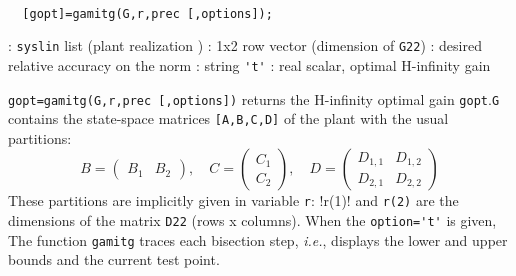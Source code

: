 \begin{mandesc}
   \\ %
\end{mandesc}
\begin{calling_sequence}
\begin{verbatim}
  [gopt]=gamitg(G,r,prec [,options]);  
\end{verbatim}
\end{calling_sequence}
\begin{parameters}
  \begin{varlist}
    : \verb!syslin! list (plant realization )
    : 1x2 row vector (dimension of \verb!G22!)
    : desired relative accuracy on the norm
    : string \verb!'t'!
    : real scalar, optimal H-infinity gain
  \end{varlist}
\end{parameters}
\begin{mandescription}
  \verb!gopt=gamitg(G,r,prec [,options])!
  returns the H-infinity optimal gain \verb!gopt!.\verb!G! contains the state-space matrices \verb![A,B,C,D]! of
  the plant with the usual partitions:
  \begin{equation*}
    B= \left( \begin{array}{cc} B_1 & B_2 \end{array} \right), \quad 
    C= \left( \begin{array}{c} C_1 \\ C_2 \end{array} \right), \quad
    D= \left( \begin{array}{cc} D_{1,1} & D_{1,2} \\ D_{2,1} & D_{2,2} \end{array} \right)
  \end{equation*}
  These partitions are implicitly given in variable \verb!r!: !r(1)! and \verb!r(2)! are the dimensions of the matrix
  \verb!D22! (rows x columns). When the \verb!option='t'! is given, The function \verb!gamitg! traces each
  bisection step, \emph{i.e.}, displays the lower and upper bounds and the current test point.
\end{mandescription}

